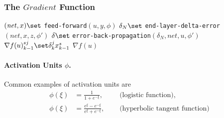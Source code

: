\subsubsection{The $\mathit{Gradient}$ Function}
\begin{algorithm} \label{alg:mlp-gradient}
\begin{algorithmic}[1]
    \State $(\mathit{net}, x) \set$ \texttt{feed-forward}$(u, y, \phi)$
    \State $\delta_N \set$ \texttt{end-layer-delta-error}$(\mathit{net}, x, z, \phi')$
    \State $\delta \set$ \texttt{error-back-propagation}$(\delta_N, \mathit{net}, u, \phi')$
                \State $\nabla f(u)_{k-1}^{sj} \set \delta_k^j x_{k-1}^s$
            \EndFor
        \EndFor
    \EndFor
    \State \Return $\nabla f(u)$
\end{algorithmic}
\end{algorithm}

\paragraph{Activation Units $\phi$.}
Common examples of activation units are
\[\begin{alignedat}{3}
\phi(\xi) &= \frac{1}{1 + e^{-\xi}}, &\quad \text{ (logistic function),}\\
\phi(\xi) &= \frac{e^{\xi} - e^{-\xi}}{e^{\xi} + e^{-\xi}}, &\quad \text{ (hyperbolic tangent function)}\\
\end{alignedat}\]

